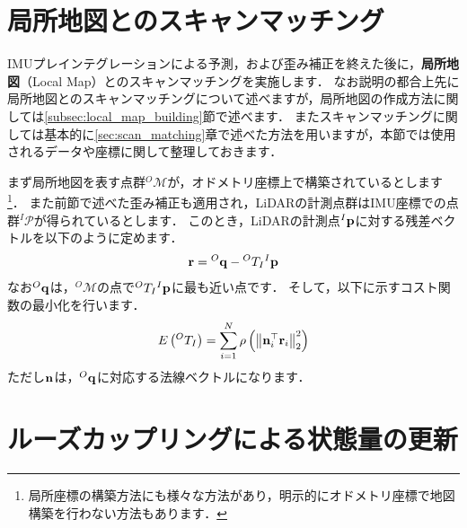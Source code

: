 \section{局所地図とのスキャンマッチング}

IMUプレインテグレーションによる予測，および歪み補正を終えた後に，{\bf 局所地図}（Local Map）とのスキャンマッチングを実施します．
なお説明の都合上先に局所地図とのスキャンマッチングについて述べますが，局所地図の作成方法に関しては\ref{subsec:local_map_building}節で述べます．
またスキャンマッチングに関しては基本的に\ref{sec:scan_matching}章で述べた方法を用いますが，本節では使用されるデータや座標に関して整理しておきます．

まず局所地図を表す点群${}^{O}\mathcal{M}$が，オドメトリ座標上で構築されているとします\footnote{局所座標の構築方法にも様々な方法があり，明示的にオドメトリ座標で地図構築を行わない方法もあります．}．
また前節で述べた歪み補正も適用され，LiDARの計測点群はIMU座標での点群${}^{I}\mathcal{P}$が得られているとします．
このとき，LiDARの計測点${}^{I}{\bf p}$に対する残差ベクトルを以下のように定めます．
%
\begin{align}
  {\bf r} = {}^{O}{\bf q} - {}^{O}T_{I} {}^{I}{\bf p}
  \label{eq:residual_vector_lio_scan_matching}
\end{align}
%
なお${}^{O}{\bf q}$は，${}^{O}\mathcal{M}$の点で${}^{O}T_{I} {}^{I}{\bf p}$に最も近い点です．
そして，以下に示すコスト関数の最小化を行います．
%
\begin{align}
  E \left( {}^{O}T_{I} \right) = \sum_{i=1}^{N} \rho \left( \left\| {\bf n}_{i}^{\top} {\bf r}_{i} \right\|_{2}^{2} \right)
  \label{eq:cost_function_lio_scan_matching}
\end{align}
%
ただし${\bf n}$は，${}^{O}{\bf q}$に対応する法線ベクトルになります．















\section{ルーズカップリングによる状態量の更新}

